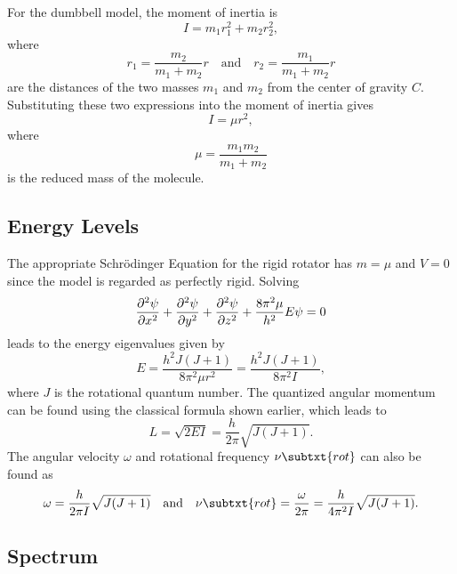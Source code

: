 For the dumbbell model, the moment of inertia is
\begin{equation*}
    I = m_{1}r_{1}^{2} + m_{2}r_{2}^{2},
\end{equation*}
where
\begin{equation*}
    r_{1} = \frac{m_{2}}{m_{1} + m_{2}}r \quad\text{and}\quad r_{2} = \frac{m_{1}}{m_{1} + m_{2}}r
\end{equation*}
are the distances of the two masses $m_{1}$ and $m_{2}$ from the center of gravity $C$. Substituting these two expressions into the moment of inertia gives
\begin{equation*}
    I = \mu r^{2},
\end{equation*}
where
\begin{equation*}
    \mu = \frac{m_{1}m_{2}}{m_{1} + m_{2}}
\end{equation*}
is the reduced mass of the molecule.

\subsection{Energy Levels}

The appropriate Schr\"odinger Equation for the rigid rotator has $m = \mu$ and $V = 0$ since the model is regarded as perfectly rigid. Solving
\begin{equation*}
    \pdv[2]{\psi}{x} + \pdv[2]{\psi}{y} + \pdv[2]{\psi}{z} + \frac{8\pi^{2}\mu}{h^{2}}E\psi = 0
\end{equation*}
leads to the energy eigenvalues given by
\begin{equation*}
    E = \frac{h^{2}J(J + 1)}{8\pi^{2}\mu r^{2}} = \frac{h^{2}J(J + 1)}{8\pi^{2}I},
\end{equation*}
where $J$ is the rotational quantum number. The quantized angular momentum can be found using the classical formula shown earlier, which leads to
\begin{equation*}
    L = \sqrt{2EI} = \frac{h}{2\pi}\sqrt{J(J + 1)}.
\end{equation*}
The angular velocity $\omega$ and rotational frequency $\nu\subtxt{rot}$ can also be found as
\begin{equation*}
    \omega = \frac{h}{2\pi I}\sqrt{J(J + 1)} \quad\text{and}\quad \nu\subtxt{rot} = \frac{\omega}{2\pi} = \frac{h}{4\pi^{2}I}\sqrt{J(J + 1)}.
\end{equation*}

\subsection{Spectrum}


